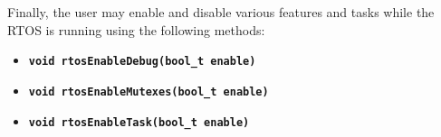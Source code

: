 \documentclass{article}
\newcommand{\bitem}[1]{\item \textbf{#1}}
\begin{document}
        Finally, the user may enable and disable various features and tasks while the RTOS is running using the following methods:
        \begin{itemize}
            \bitem{\texttt{void rtosEnableDebug(bool\_t enable)}}
            \bitem{\texttt{void rtosEnableMutexes(bool\_t enable)}}
            \bitem{\texttt{void rtosEnableTask(bool\_t enable)}}
        \end{itemize}
		
\end{document}
